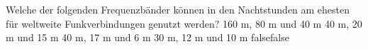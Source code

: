     {Welche der folgenden Frequenzbänder können in den Nachtstunden am ehesten für weltweite Funkverbindungen genutzt werden?}
    {160 m, 80 m und 40 m}
    {40 m, 20 m und 15 m}
    {40 m, 17 m und 6 m}
    { 30 m, 12 m und 10 m}
    {false}{false}